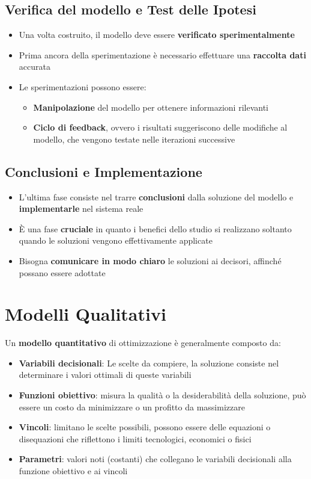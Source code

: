 \subsection{Verifica del modello e Test delle Ipotesi}
\begin{itemize}
    \item Una volta costruito, il modello deve essere \textbf{verificato sperimentalmente}
    \item Prima ancora della sperimentazione è necessario effettuare una \textbf{raccolta dati} accurata
    \item Le sperimentazioni possono essere:
    \begin{itemize}
        \item \textbf{Manipolazione} del modello per ottenere informazioni rilevanti
        \item \textbf{Ciclo di feedback}, ovvero i risultati suggeriscono delle modifiche al modello, che vengono testate nelle iterazioni successive
    \end{itemize}
\end{itemize}

\subsection{Conclusioni e Implementazione}
\begin{itemize}
    \item L'ultima fase consiste nel trarre \textbf{conclusioni} dalla soluzione del modello e \textbf{implementarle} nel sistema reale
    \item È una fase \textbf{cruciale} in quanto i benefici dello studio si realizzano soltanto quando le soluzioni vengono effettivamente applicate
    \item Bisogna \textbf{comunicare in modo chiaro} le soluzioni ai decisori, affinché possano essere adottate
\end{itemize}

\section{Modelli Qualitativi}
Un \textbf{modello quantitativo} di ottimizzazione è generalmente composto da:
\begin{itemize}
    \item \textbf{Variabili decisionali}: Le scelte da compiere, la soluzione consiste nel determinare i valori ottimali di queste variabili
    \item \textbf{Funzioni obiettivo}: misura la qualità o la desiderabilità della soluzione, può essere un costo da minimizzare o un profitto da massimizzare
    \item \textbf{Vincoli}: limitano le scelte possibili, possono essere delle equazioni o disequazioni che riflettono i limiti tecnologici, economici o fisici
    \item \textbf{Parametri}: valori noti (costanti) che collegano le variabili decisionali alla funzione obiettivo e ai vincoli
\end{itemize}

